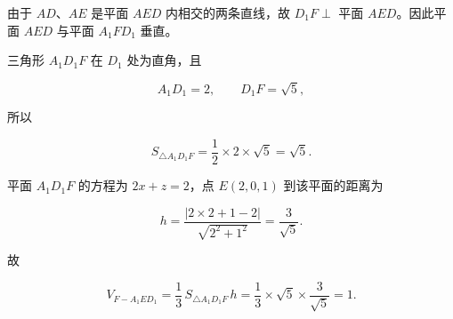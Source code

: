 \begin{answer}
由于 $AD$、$AE$ 是平面 $AED$ 内相交的两条直线，故 $D_1F\perp$ 平面 $AED$。因此平面 $AED$ 与平面 $A_1FD_1$ 垂直。


三角形 $A_1D_1F$ 在 $D_1$ 处为直角，且

\nopagebreak[4]
\[
A_1D_1=2,\qquad D_1F=\sqrt5,
\]

所以

\nopagebreak[4]
\[
S_{\triangle A_1D_1F}=\frac12\times2\times\sqrt5=\sqrt5.
\]

平面 $A_1D_1F$ 的方程为 $2x+z=2$，点 $E(2,0,1)$ 到该平面的距离为

\nopagebreak[4]
\[
h=\frac{|2\times2+1-2|}{\sqrt{2^2+1^2}}=\frac3{\sqrt5}.
\]

故

\nopagebreak[4]
\[
V_{F-A_1ED_1}
=\frac13\,S_{\triangle A_1D_1F}\,h
=\frac13\times\sqrt5\times\frac3{\sqrt5}=1.
\]





\end{answer}
